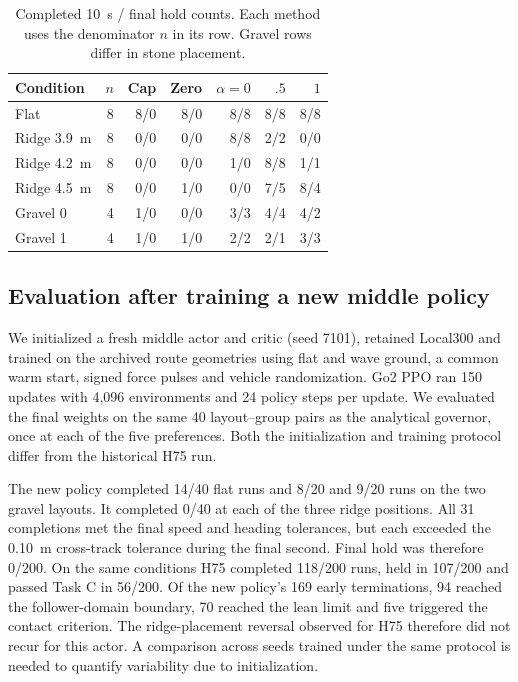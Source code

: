 \documentclass[journal]{IEEEtran}
\begin{document}
\begin{table}[t]\centering\footnotesize
\caption{Completed 10~s / final hold counts. Each method uses the denominator $n$ in its row. Gravel rows differ in stone placement.}\label{tab:cap}
\begin{tabular}{@{}lrrrrrr@{}}\toprule
Condition & $n$ & Cap & Zero & $\alpha=0$ & $.5$ & $1$\\\midrule
Flat &8&8/0&8/0&8/8&8/8&8/8\\
Ridge 3.9~m &8&0/0&0/0&8/8&2/2&0/0\\
Ridge 4.2~m &8&0/0&0/0&1/0&8/8&1/1\\
Ridge 4.5~m &8&0/0&1/0&0/0&7/5&8/4\\
Gravel 0 &4&1/0&0/0&3/3&4/4&4/2\\
Gravel 1 &4&1/0&1/0&2/2&2/1&3/3\\\bottomrule
\end{tabular}\end{table}

\subsection{Evaluation after training a new middle policy}
We initialized a fresh middle actor and critic (seed 7101), retained Local300 and trained on the archived route geometries using flat and wave ground, a common warm start, signed force pulses and vehicle randomization. Go2 PPO ran 150 updates with 4,096 environments and 24 policy steps per update. We evaluated the final weights on the same 40 layout--group pairs as the analytical governor, once at each of the five preferences. Both the initialization and training protocol differ from the historical H75 run.

The new policy completed 14/40 flat runs and 8/20 and 9/20 runs on the two gravel layouts. It completed 0/40 at each of the three ridge positions. All 31 completions met the final speed and heading tolerances, but each exceeded the 0.10~m cross-track tolerance during the final second. Final hold was therefore 0/200. On the same conditions H75 completed 118/200 runs, held in 107/200 and passed Task C in 56/200. Of the new policy's 169 early terminations, 94 reached the follower-domain boundary, 70 reached the lean limit and five triggered the contact criterion. The ridge-placement reversal observed for H75 therefore did not recur for this actor. A comparison across seeds trained under the same protocol is needed to quantify variability due to initialization.
\end{document}
